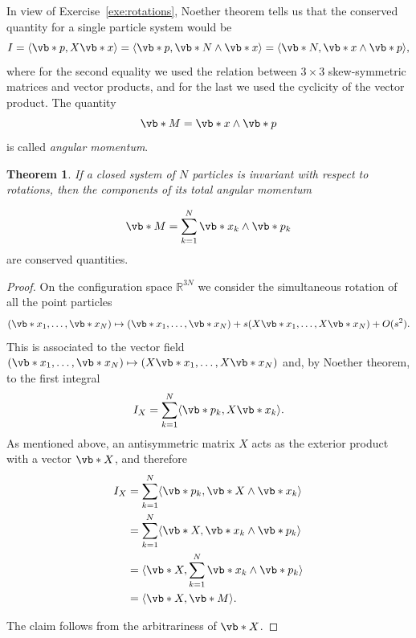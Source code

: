 \documentclass[english,fontsize=11pt,paper=b5]{scrbook}
\newtheorem{theorem}{Theorem}[chapter]
\theoremstyle{definition}
\begin{document}
    In view of Exercise~\ref{exe:rotations}, Noether theorem tells us that the conserved quantity for a single particle system would be
    \begin{equation}
      I = \langle\vb*{p}, X\vb*{x}\rangle = \langle\vb*{p}, \vb*{N}\wedge \vb*{x}\rangle = \langle\vb*{N}, \vb*{x}\wedge \vb*{p} \rangle,
    \end{equation}
    where for the second equality we used the relation between $3\times3$ skew-symmetric matrices and vector products, and for the last we used the cyclicity of the vector product.
    The quantity
    \begin{equation}
      \vb*{M} = \vb*{x} \wedge \vb*{p}
    \end{equation}
    is called \emph{angular momentum}.

    \begin{theorem}
      If a closed system of $N$ particles is invariant with respect to rotations, then the components of its \emph{total angular momentum}
    \end{theorem}
    \begin{equation}
      \vb*{M} = \sum_{k=1}^N \vb*{x}_k \wedge \vb*{p}_k
    \end{equation}
    are conserved quantities.
    \begin{proof}
      On the configuration space $\mathbb{R}^{3N}$ we consider the simultaneous rotation of all the point particles
      \begin{equation}
        (\vb*{x}_1,\ldots,\vb*{x}_N) \mapsto
        (\vb*{x}_1,\ldots,\vb*{x}_N) +
        s (X\vb*{x}_1,\ldots,X\vb*{x}_N) + O(s^2).
      \end{equation}
      This is associated to the vector field $(\vb*{x}_1,\ldots,\vb*{x}_N) \mapsto (X\vb*{x}_1,\ldots,X\vb*{x}_N)$ and, by Noether theorem, to the first integral
      \begin{equation}
        I_X = \sum_{k=1}^N \langle\vb*{p}_k, X\vb*{x}_k\rangle.
      \end{equation}
      As mentioned above, an antisymmetric matrix $X$ acts as the exterior product with a vector $\vb*{X}$, and therefore
      \begin{align}
        I_X & = \sum_{k=1}^N \langle\vb*{p}_k, \vb*{X}\wedge\vb*{x}_k\rangle  \\
            & = \sum_{k=1}^N \langle\vb*{X}, \vb*{x}_k\wedge \vb*{p}_k\rangle \\
            & = \langle\vb*{X}, \sum_{k=1}^N \vb*{x}_k\wedge \vb*{p}_k\rangle \\
            & = \langle\vb*{X},\vb*{M}\rangle.
      \end{align}

      The claim follows from the arbitrariness of $\vb*{X}$.
    \end{proof}
\end{document}
